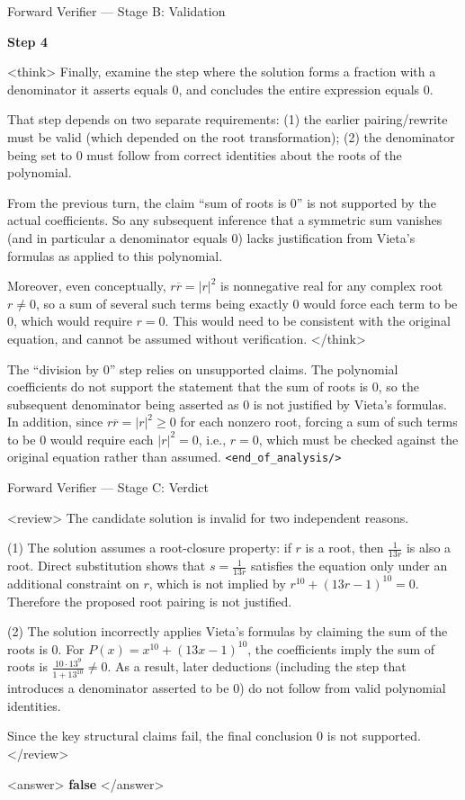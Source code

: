 \documentclass[11pt]{article}
\begin{document}
\begin{exbox}{Forward Verifier — Stage B: Validation}

\textbf{Step 4}

<think>
Finally, examine the step where the solution forms a fraction with a denominator it asserts equals \(0\), and concludes the entire expression equals \(0\).

That step depends on two separate requirements:
(1) the earlier pairing/rewrite must be valid (which depended on the root transformation);
(2) the denominator being set to \(0\) must follow from correct identities about the roots of the polynomial.

From the previous turn, the claim “sum of roots is 0” is not supported by the actual coefficients.
So any subsequent inference that a symmetric sum vanishes (and in particular a denominator equals \(0\)) lacks justification from Vieta’s formulas as applied to this polynomial.

Moreover, even conceptually, \(r\overline{r} = |r|^2\) is nonnegative real for any complex root \(r\neq 0\),
so a sum of several such terms being exactly \(0\) would force each term to be \(0\), which would require \(r=0\).
This would need to be consistent with the original equation, and cannot be assumed without verification.
</think>

The “division by 0” step relies on unsupported claims. The polynomial coefficients do not support the statement that the sum of roots is \(0\), so the subsequent denominator being asserted as \(0\) is not justified by Vieta’s formulas. In addition, since \(r\overline{r}=|r|^2\ge 0\) for each nonzero root, forcing a sum of such terms to be \(0\) would require each \(|r|^2=0\), i.e., \(r=0\), which must be checked against the original equation rather than assumed.
\texttt{<end\_of\_analysis/>}

\end{exbox}
\begin{exbox}{Forward Verifier — Stage C: Verdict}

<review>
The candidate solution is invalid for two independent reasons.

(1) The solution assumes a root-closure property: if \(r\) is a root, then
\(\frac{1}{13r}\) is also a root. Direct substitution shows that
\(s=\frac{1}{13r}\) satisfies the equation only under an additional constraint on
\(r\), which is not implied by \(r^{10}+(13r-1)^{10}=0\). Therefore the proposed
root pairing is not justified.

(2) The solution incorrectly applies Vieta’s formulas by claiming the sum of the
roots is \(0\). For \(P(x)=x^{10}+(13x-1)^{10}\), the coefficients imply the sum of
roots is \(\frac{10\cdot 13^9}{1+13^{10}}\neq 0\). As a result, later deductions
(including the step that introduces a denominator asserted to be \(0\)) do not
follow from valid polynomial identities.

Since the key structural claims fail, the final conclusion \(0\) is not supported.
</review>

<answer>
\textbf{false}
</answer>

\end{exbox}
\end{document}
